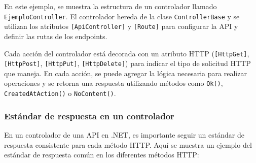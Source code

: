 \documentclass[executivepaper]{article}
\begin{document}
En este ejemplo, se muestra la estructura de un controlador llamado \lstinline{EjemploController}. El controlador hereda de la clase \lstinline{ControllerBase} y se utilizan los atributos \lstinline{[ApiController]} y \lstinline{[Route]} para configurar la API y definir las rutas de los endpoints.

Cada acción del controlador está decorada con un atributo HTTP (\lstinline{[HttpGet]}, \lstinline{[HttpPost]}, \lstinline{[HttpPut]}, \lstinline{[HttpDelete]}) para indicar el tipo de solicitud HTTP que maneja. En cada acción, se puede agregar la lógica necesaria para realizar operaciones y se retorna una respuesta utilizando métodos como \lstinline{Ok()}, \lstinline{CreatedAtAction()} o \lstinline{NoContent()}.

\subsubsection{Estándar de respuesta en un controlador}

En un controlador de una API en .NET, es importante seguir un estándar de respuesta consistente para cada método HTTP. Aquí se muestra un ejemplo del estándar de respuesta común en los diferentes métodos HTTP:
\end{document}
